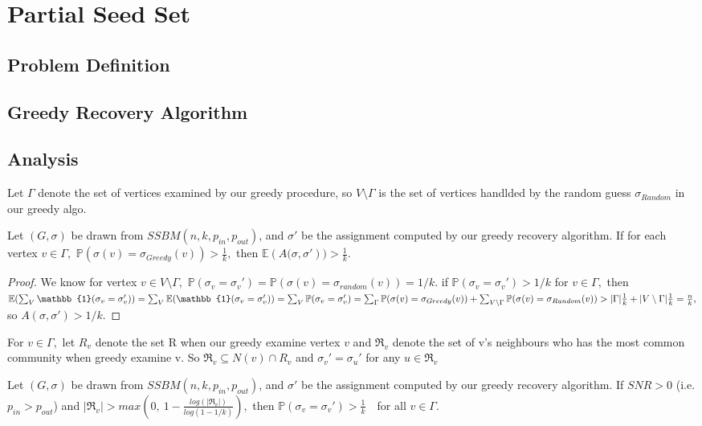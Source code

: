 \chapter{Partial Seed Set}
\section{Problem Definition}
\section{Greedy Recovery Algorithm}
\section{Analysis}
Let $\Gamma$ denote the set of vertices examined by our greedy procedure, so $V\setminus\Gamma$ is the set of vertices handlded by the random guess $\sigma_{Random}$ in our greedy algo.
\begin{lemma}\label{lemma1}
    Let $(G, \sigma)$ be drawn from $SSBM(n, k, p_{in}, p_{out})$, and $\sigma'$ be the assignment computed by our greedy recovery algorithm. If for each vertex $v\in\Gamma,$ $\mathbb{P}(\sigma(v)=\sigma_{Greedy}(v))>\frac{1}{k},$ then $\mathbb{E}({A(\sigma, \sigma'}))>\frac{1}{k}.$
\end{lemma}
\begin{proof}
 We know for vertex $v\in V\setminus\Gamma,$ $\mathbb{P}(\sigma_v=\sigma_v')=\mathbb{P}(\sigma(v)=\sigma_{random}(v))=1/k.$ if $\mathbb{P}(\sigma_v=\sigma_v')>1/k$ for $v\in\Gamma,$ then $\mathbb{E}(\sum_V\mathbb{1}(\sigma_v=\sigma_v'))=\sum_V\mathbb{E}(\mathbb{1}(\sigma_v=\sigma_v'))=\sum_V\mathbb{P}(\sigma_v=\sigma_v')=\sum_\Gamma\mathbb{P}(\sigma(v)=\sigma_{Greedy}(v))+\sum_{V\setminus\Gamma}\mathbb{P}(\sigma(v)=\sigma_{Random}(v))\\>|\Gamma|\frac{1}{k}+|V\setminus\Gamma|\frac{1}{k}=\frac{n}{k},$ so $A(\sigma, \sigma')>1/k.$
\end{proof}
For $v\in\Gamma,$ let $R_v$ denote the set R when our greedy examine vertex $v$ and $\Re_v$ denote the set of v's neighbours who has the most common community when greedy examine v. So $\Re_v\subseteq N(v)\cap R_v$ and $\sigma_v'=\sigma_u'$ for any $u\in\Re_v$
\begin{claim}\label{claim2}
     Let $(G, \sigma)$ be drawn from $SSBM(n, k, p_{in}, p_{out})$, and $\sigma'$ be the assignment computed by our greedy recovery algorithm. If $SNR>0$ (i.e. $p_{in}>p_{out}$) and $|\Re_v|>max(0,~1-\frac{log(|\Re_v|)}{log(1-1/k)}),$ then $\mathbb{P}(\sigma_v=\sigma_v')>\frac{1}{k}$~~for all $v\in\Gamma.$
\end{claim}
